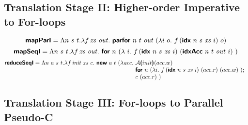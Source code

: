 \clearpage

\subsection{Translation Stage II: Higher-order Imperative to For-loops}
\label{sec:translation-ii}

\newcommand{\ei}{\prim{idx}~n~\dtone~\mathit{xs}~i}
\newcommand{\ea}{\prim{idxAcc}~n~\dttwo~\mathit{out}~i}

\begin{displaymath}
  \prim{mapParI}
  =
  \Lambda n~\dtone~\dttwo.\lambda f\,\mathit{xs}~\mathit{out}.~
  \prim{parfor}~n~\dttwo~\mathit{out}~(\lambda i~o.~f\,(\ei)~o)
\end{displaymath}
\begin{displaymath}
  \prim{mapSeqI}
  =
  \Lambda n~\dtone~\dttwo.\lambda f\,\mathit{xs}~\mathit{out}.~
  \prim{for}~n~(\lambda~i.~f\,(\ei)~(\ea)\ )
\end{displaymath}
\begin{displaymath}
  \prim{reduceSeqI}
  =
  \Lambda n~a~\dtone~\dttwo.\lambda f\,\mathit{init}~\mathit{xs}~c.~\prim{new}~a~\dttwo~(\lambda \mathit{acc}.~
    \begin{array}[t]{@{}l}
    \semA{init}(acc.w)\\
    \prim{for}~n~(\lambda i.~f\,(\ei)~(acc.r)~(acc.w)\ );\\
    c~(acc.r)\ )
    \end{array}
\end{displaymath}

\clearpage

\subsection{Translation Stage III: For-loops to Parallel Pseudo-C}
\label{sec:translation-iii}


\newcommand{\codegenComm}[1]{\textsc{CodeGen}_{\mathsf{comm}}(#1)}
\newcommand{\codegenAcc}[2]{\textsc{CodeGen}_{\mathsf{acc}[#1]}(#2)}
\newcommand{\codegenExp}[2]{\textsc{CodeGen}_{\mathsf{exp}[#1]}(#2)}
\newcommand{\codegenData}[1]{\textsc{CodeGen}_{\mathsf{\datatype}}(#1)}

